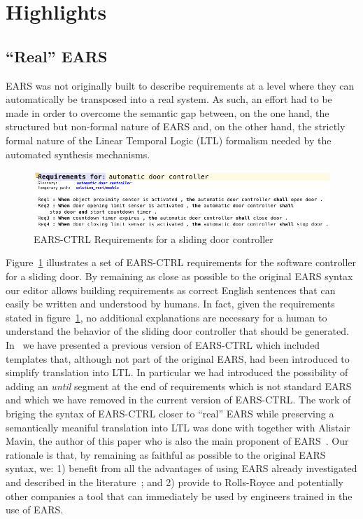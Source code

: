 \section{Highlights}
\vspace{-.2cm}
\subsection{``Real'' EARS}
EARS was not originally built to describe requirements at a level where they can
automatically be transposed into a real system. As such, an effort had to be
made in order to overcome the semantic gap between, on the one hand, the
structured but non-formal nature of EARS and, on the other hand, the strictly
formal nature of the Linear Temporal Logic (LTL) formalism needed by the
automated synthesis mechanisms.\vspace{-.5cm}
\begin{figure}[h!]
   \begin{center}
     \includegraphics[width=1\textwidth]{images/EARS-Reqs.png}
     \caption{\textsf{EARS-CTRL} Requirements for a sliding door
     controller}
     \label{fig:ears_reqs}
   \end{center} 
 \end{figure}
\vspace{-1cm}Figure~\ref{fig:ears_reqs} illustrates a set of \textsf{EARS-CTRL}
requirements for the software controller for a sliding door. By remaining as close as
possible to the original EARS syntax our editor allows building requirements as
correct English sentences that can easily be written and understood by humans.
In fact, given the requirements stated in figure~\ref{fig:ears_reqs}, no
additional explanations are necessary for a human to understand the behavior of
the sliding door controller that should be generated. In~\cite{LucioRCM17} we
have presented a previous version of \textsf{EARS-CTRL} which included templates
that, although not part of the original EARS, had been introduced to simplify
translation into LTL. In particular we had introduced the possibility of adding
an \emph{until} segment at the end of requirements which is not standard EARS
and which we have removed in the current version of \textsf{EARS-CTRL}.
The work of briging the syntax of \textsf{EARS-CTRL} closer to ``real'' EARS while preserving a semantically
meaniful translation into LTL was done with together with Alistair Mavin, the
author of this paper who is also the main proponent of EARS~\cite{EARS09}.
Our rationale is that, by remaining as faithful as possible to the original EARS
syntax, we: 1) benefit from all the advantages of using EARS already
investigated and described in the literature~\cite{EARS09,EARS16}; and 2)
provide to Rolls-Royce and potentially other companies a tool that can
immediately be used by engineers trained in the use of EARS.\vspace{-.5cm}

